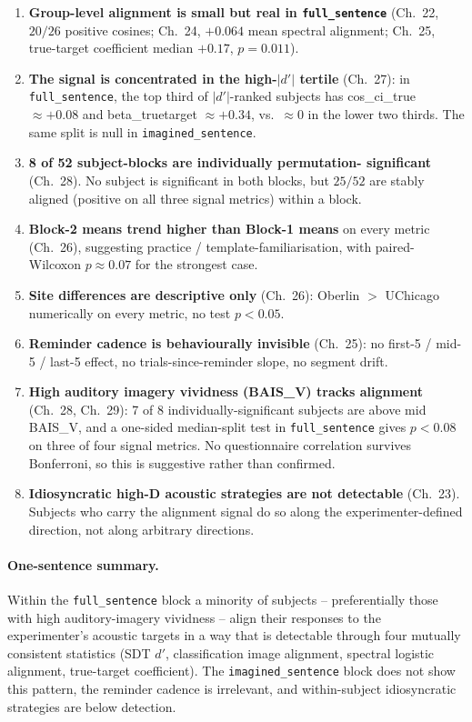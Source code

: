 \documentclass[11pt]{article}
\begin{document}
\begin{enumerate}
\item \textbf{Group-level alignment is small but real in
      \texttt{full\_sentence}} (Ch.~22, $20/26$ positive cosines;
      Ch.~24, $+0.064$ mean spectral alignment; Ch.~25, true-target
      coefficient median $+0.17$, $p=0.011$).
\item \textbf{The signal is concentrated in the high-$|d'|$ tertile}
      (Ch.~27): in \texttt{full\_sentence}, the top third of
      $|d'|$-ranked subjects has cos\_ci\_true $\approx +0.08$ and
      beta\_truetarget $\approx +0.34$, vs.\ $\approx 0$ in the lower
      two thirds. The same split is null in
      \texttt{imagined\_sentence}.
\item \textbf{8 of 52 subject-blocks are individually permutation-
      significant} (Ch.~28). No subject is significant in both
      blocks, but $25/52$ are stably aligned (positive on all three
      signal metrics) within a block.
\item \textbf{Block-2 means trend higher than Block-1 means} on every
      metric (Ch.~26), suggesting practice / template-familiarisation,
      with paired-Wilcoxon $p\approx 0.07$ for the strongest case.
\item \textbf{Site differences are descriptive only} (Ch.~26):
      Oberlin $>$ UChicago numerically on every metric, no test
      $p<0.05$.
\item \textbf{Reminder cadence is behaviourally invisible} (Ch.~25):
      no first-5 / mid-5 / last-5 effect, no
      trials-since-reminder slope, no segment drift.
\item \textbf{High auditory imagery vividness (BAIS\_V) tracks
      alignment} (Ch.~28, Ch.~29): 7 of 8 individually-significant
      subjects are above mid BAIS\_V, and a one-sided median-split
      test in \texttt{full\_sentence} gives $p<0.08$ on three of
      four signal metrics. No questionnaire correlation survives
      Bonferroni, so this is suggestive rather than confirmed.
\item \textbf{Idiosyncratic high-D acoustic strategies are not
      detectable} (Ch.~23). Subjects who carry the alignment signal
      do so along the experimenter-defined direction, not along
      arbitrary directions.
\end{enumerate}

\paragraph{One-sentence summary.}
Within the \texttt{full\_sentence} block a minority of subjects --
preferentially those with high auditory-imagery vividness -- align
their responses to the experimenter's acoustic targets in a way that
is detectable through four mutually consistent statistics
(SDT $d'$, classification image alignment, spectral logistic
alignment, true-target coefficient). The \texttt{imagined\_sentence}
block does not show this pattern, the reminder cadence is irrelevant,
and within-subject idiosyncratic strategies are below detection.
\end{document}
